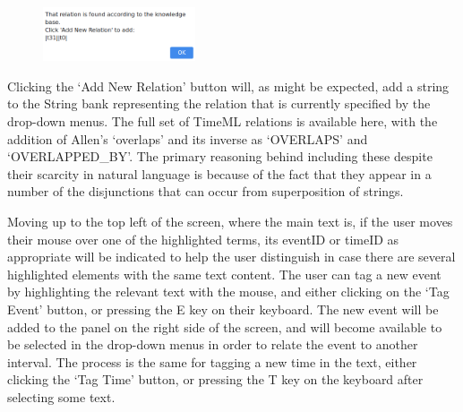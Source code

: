 \documentclass[a4paper,12pt,leqno,twoside]{article}
\begin{document}
\begin{center}
	\begin{figure}[h!]
		\centering
		\includegraphics[width=0.4\textwidth]{images/START-test-2.png}
	\end{figure}
\end{center}
Clicking the `Add New Relation' button will, as might be expected, add a string to the String bank representing the relation that is currently specified by the drop-down menus. The full set of TimeML relations is available here, with the addition of Allen's `overlaps' and its inverse as `OVERLAPS' and `OVERLAPPED\_BY'. The primary reasoning behind including these despite their scarcity in natural language is because of the fact that they appear in a number of the disjunctions that can occur from superposition of strings.

Moving up to the top left of the screen, where the main text is, if the user moves their mouse over one of the highlighted terms, its eventID or timeID as appropriate will be indicated to help the user distinguish in case there are several highlighted elements with the same text content. The user can tag a new event by highlighting the relevant text with the mouse, and either clicking on the `Tag Event' button, or pressing the E key on their keyboard. The new event will be added to the panel on the right side of the screen, and will become available to be selected in the drop-down menus in order to relate the event to another interval. The process is the same for tagging a new time in the text, either clicking the `Tag Time' button, or pressing the T key on the keyboard after selecting some text.
\end{document}
